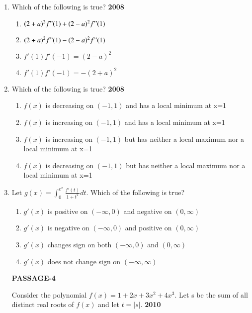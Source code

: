 \documentclass[journal,12pt,twocolumn]{IEEEtran}
\theoremstyle{remark}
\begin{document}
\begin{enumerate}
 \item Which of the following is true?
\hfill{\textbf{2008}}
\begin{enumerate}
    \item $(2+a)^2 f"(1)+(2-a)^2 f"(1)$ 
    \item $(2+a)^2 f"(1)-(2-a)^2 f"(1)$
    \item $f'(1)f'(-1)=(2-a)^2$ 
     \item $f'(1)f'(-1)=-(2+a)^2$ 
\end{enumerate}
\item Which of the following is true?
\hfill{\textbf{2008}}
\begin{enumerate}
    \item $f(x)$ is decreasing on $(-1,1)$ and has a local minimum at x=1
    \item $f(x)$ is increasing on $(-1,1)$ and has a local minimum at x=1
    \item $f(x)$  is increasing on $(-1,1)$ but has neither a local maximum nor a local minimum at x=1
    \item $f(x)$  is decreasing on $(-1,1)$ but has neither a local maximum nor a local minimum at x=1
\end{enumerate}
\item Let $g(x)=\int_{0}^{e^x}\frac{f'(t)}{1+t^2}dt$. Which of the following is true?
\begin{enumerate}
    \item $g'(x)$ is positive on $(-\infty,0)$ and negative on $(0,\infty)$
     \item $g'(x)$ is negative on $(-\infty,0)$ and positive on $(0,\infty)$
     \item $g'(x)$ changes sign on both $(-\infty,0)$ and $(0,\infty)$
     \item $g'(x)$ does not change sign on $(-\infty,\infty)$  
\end{enumerate}
\textbf{PASSAGE-4}

Consider the polynomial $f(x) = 1+2x+3x^2+4x^3$. Let s be the sum of all distinct real roots of $f(x)$ and let $t=|s|$.
\hfill{\textbf{2010}}


\end{enumerate}
\end{document}
